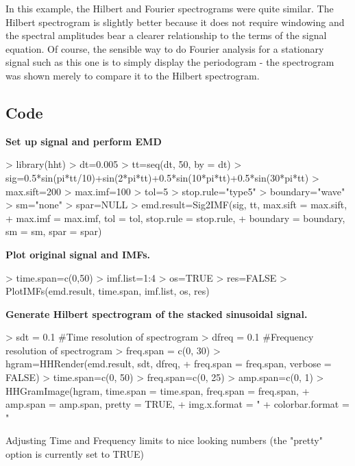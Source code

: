 \documentclass[12pt]{article}
\begin{document}
In this example, the Hilbert and Fourier spectrograms were quite similar. 
The Hilbert spectrogram is slightly better because it does not require windowing and the spectral amplitudes bear a clearer relationship to the terms of the signal equation.
Of course, the sensible way to do Fourier analysis for a stationary signal such as this one is to simply display the periodogram - the spectrogram was shown merely to compare it to the Hilbert spectrogram.

\subsection{Code}

\textbf{Set up signal and perform EMD}
\begin{Schunk}
\begin{Sinput}
> library(hht)
> dt=0.005
> tt=seq(dt, 50, by = dt)
> sig=0.5*sin(pi*tt/10)+sin(2*pi*tt)+0.5*sin(10*pi*tt)+0.5*sin(30*pi*tt)
> max.sift=200
> max.imf=100
> tol=5
> stop.rule="type5"
> boundary="wave"
> sm="none"
> spar=NULL
> emd.result=Sig2IMF(sig, tt, max.sift = max.sift,
+     max.imf = max.imf, tol = tol, stop.rule = stop.rule, 
+     boundary = boundary, sm = sm, spar = spar)
\end{Sinput}
\end{Schunk}

\textbf{Plot original signal and IMFs.}
\begin{Schunk}
\begin{Sinput}
> time.span=c(0,50)
> imf.list=1:4
> os=TRUE
> res=FALSE
> PlotIMFs(emd.result, time.span, imf.list, os, res)
\end{Sinput}
\end{Schunk}

\textbf{Generate Hilbert spectrogram of the stacked sinusoidal signal.}

\begin{Schunk}
\begin{Sinput}
> sdt = 0.1 #Time resolution of spectrogram
> dfreq = 0.1 #Frequency resolution of spectrogram
> freq.span = c(0, 30)
> hgram=HHRender(emd.result, sdt, dfreq, 
+     freq.span = freq.span, verbose = FALSE)
> time.span=c(0, 50)
> freq.span=c(0, 25)
> amp.span=c(0, 1)
> HHGramImage(hgram, time.span = time.span, freq.span = freq.span, 
+     amp.span = amp.span, pretty = TRUE, 
+     img.x.format = "%.0f", img.y.format = "%.0f", 
+     colorbar.format = "%.0f", trace.format = "%.1f")
\end{Sinput}
\begin{Soutput}
Adjusting Time and Frequency limits to nice looking numbers (the "pretty" option is currently set to TRUE)
\end{Soutput}
\end{Schunk}
\end{document}
